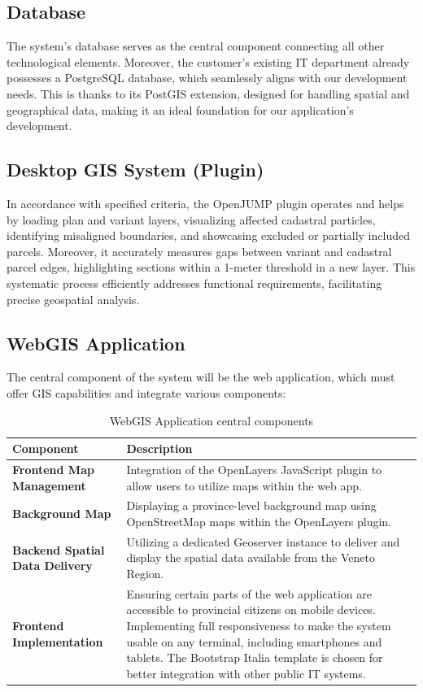 \subsection{Database}\label{subsec:database}
The system's database serves as the central component connecting all other technological elements.
Moreover, the customer's existing IT department already possesses a PostgreSQL database, which seamlessly aligns with our development needs.
This is thanks to its PostGIS extension, designed for handling spatial and geographical data, making it an ideal foundation for our application's development.

\subsection{Desktop GIS System (Plugin)}\label{subsec:openjump-plugin}
In accordance with specified criteria, the OpenJUMP plugin operates and helps by loading plan and variant layers, visualizing affected cadastral particles, identifying misaligned boundaries, and showcasing excluded or partially included parcels.
Moreover, it accurately measures gaps between variant and cadastral parcel edges, highlighting sections within a 1-meter threshold in a new layer.
This systematic process efficiently addresses functional requirements, facilitating precise geospatial analysis.

\subsection{WebGIS Application}\label{subsec:webgis-application}
The central component of the system will be the web application, which must offer GIS capabilities and integrate various components:

\begin{table}[htbp]
    \centering
    \renewcommand{\arraystretch}{1.1}
    \begin{tabular}{|l|p{9cm}|}
        \hline
        \textbf{Component} & \textbf{Description} \\
        \hline
        \textbf{Frontend Map Management} & Integration of the OpenLayers JavaScript plugin to allow users to utilize maps within the web app. \\
        \hline
        \textbf{Background Map} & Displaying a province-level background map using OpenStreetMap maps within the OpenLayers plugin. \\
        \hline
        \textbf{Backend Spatial Data Delivery} & Utilizing a dedicated Geoserver instance to deliver and display the spatial data available from the Veneto Region. \\
        \hline
        \textbf{Frontend Implementation} & Ensuring certain parts of the web application are accessible to provincial citizens on mobile devices. Implementing full responsiveness to make the system usable on any terminal, including smartphones and tablets. The Bootstrap Italia template is chosen for better integration with other public IT systems. \\
        \hline
    \end{tabular}
    \caption{WebGIS Application central components \label{tab:table-web-components}}
\end{table}

